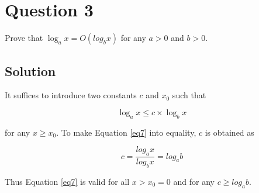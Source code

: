 
\section*{Question 3}
Prove that $\log_a x = O(log_b x)$ for any $a > 0$ and $b > 0$.

\subsection*{Solution}
It suffices to introduce two constants $c$ and $x_0$ such that 

\begin{equation}
\log_a x \leq c\times \log_b x
\label{eq7}
\end{equation}

for any $x \geq x_0$. To make Equation \ref{eq7} into equality, $c$ is obtained as

\begin{equation}
c = \frac{log_a x}{log_b x} = log_a b
\end{equation}

Thus Equation \ref{eq7} is valid for all $x > x_0 = 0$ and for any $c \geq log_a b$.
